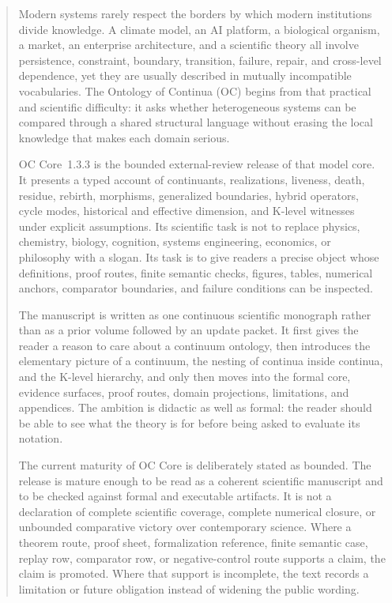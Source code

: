 \clearpage
\begin{abstract}
Modern systems rarely respect the borders by which modern institutions divide
knowledge. A climate model, an AI platform, a biological organism, a market, an
enterprise architecture, and a scientific theory all involve persistence,
constraint, boundary, transition, failure, repair, and cross-level dependence,
yet they are usually described in mutually incompatible vocabularies. The
Ontology of Continua (OC) begins from that practical and scientific difficulty:
it asks whether heterogeneous systems can be compared through a shared
structural language without erasing the local knowledge that makes each domain
serious.

OC Core~1.3.3 is the bounded external-review release of that model core. It
presents a typed account of continuants, realizations, liveness, death,
residue, rebirth, morphisms, generalized boundaries, hybrid operators, cycle
modes, historical and effective dimension, and K-level witnesses under explicit
assumptions. Its scientific task is not to replace physics, chemistry, biology,
cognition, systems engineering, economics, or philosophy with a slogan. Its
task is to give readers a precise object whose definitions, proof routes,
finite semantic checks, figures, tables, numerical anchors, comparator
boundaries, and failure conditions can be inspected.

The manuscript is written as one continuous scientific monograph rather than as
a prior volume followed by an update packet. It first gives the reader a reason
to care about a continuum ontology, then introduces the elementary picture of a
continuum, the nesting of continua inside continua, and the K-level hierarchy,
and only then moves into the formal core, evidence surfaces, proof routes,
domain projections, limitations, and appendices. The ambition is didactic as
well as formal: the reader should be able to see what the theory is for before
being asked to evaluate its notation.

The current maturity of OC Core is deliberately stated as bounded. The release
is mature enough to be read as a coherent scientific manuscript and to be
checked against formal and executable artifacts. It is not a declaration of
complete scientific coverage, complete numerical closure, or unbounded
comparative victory over contemporary science. Where a theorem route, proof
sheet, formalization reference, finite semantic case, replay row, comparator row, or
negative-control route supports a claim, the claim is promoted. Where that
support is incomplete, the text records a limitation or future obligation
instead of widening the public wording.


\end{abstract}
